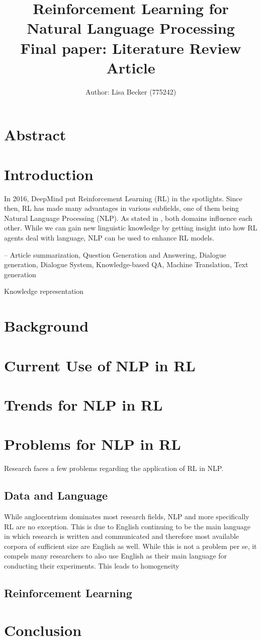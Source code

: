 \documentclass[11pt,a4paper]{article}
\title{{\LARGE Reinforcement Learning for Natural Language Processing}\\[1.5mm]
{\large Final paper: Literature Review Article}\\[1.5mm]}
\author{Author: Lisa Becker (775242) }
\begin{document}
\maketitle
\section{Abstract}


\section{Introduction}
In 2016, DeepMind put Reinforcement Learning (RL) in the spotlights. Since then, RL has made many advantages in various subfields, one of them being Natural Language Processing (NLP). As stated in \citet{ijcai2019}, both domains influence each other. While we can gain new linguistic knowledge by getting insight into how RL agents deal with language, NLP can be used to enhance RL models. 

-- Article summarization, Question Generation and Answering, Dialogue generation, Dialogue System, Knowledge-based QA, Machine Translation, Text generation

Knowledge representation

\section{Background}

\section{Current Use of NLP in RL}

\section{Trends for NLP in RL}

\section{Problems for NLP in RL}
Research faces a few problems regarding the application of RL in NLP. 

\subsection{Data and Language}
While anglocentrism dominates most research fields, NLP and more specifically RL are no exception. This is due to English continuing to be the main language in which research is written and communicated and therefore most available corpora of sufficient size are English as well. While this is not a problem per se, it compels many researchers to also use English as their main language for conducting their experiments. This leads to homogeneity 

\subsection{Reinforcement Learning}

\section{Conclusion}

\newpage

\end{document}
